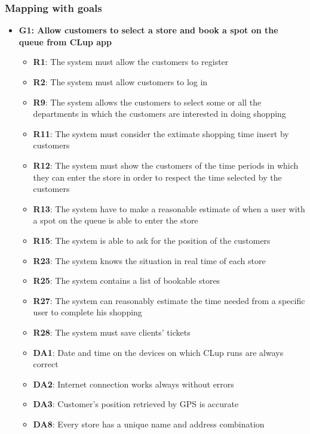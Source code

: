 \documentclass{article}
\begin{document}
		\newpage
		
		\subsubsection{Mapping with goals}
			
			\begin{itemize}			

				\item {\bfseries G1: Allow customers to select a store and book a spot on the queue from CLup app}			

					\begin{itemize}
						
						\item {\bfseries R1}: The system must allow the customers to register
						\item {\bfseries R2}: The system must allow customers to log in
						\item {\bfseries R9}: The system allows the customers to select some or all the departments in which the customers are interested in doing shopping						\item {\bfseries R11}: The system must consider the extimate shopping time insert by customers
						\item {\bfseries R12}: The system must show the customers of the time periods in which they can enter the store in order to respect the time selected by the customers
						\item {\bfseries R13}: The system have to make a reasonable estimate of when a user with a spot on the queue is able to enter the store
						\item {\bfseries R15}: The system is able to ask for the position of the customers
						\item {\bfseries R23}: The system knows the situation in real time of each store \\				\item {\bfseries R25}: The system contains a list of bookable stores
						\item {\bfseries R27}: The system can reasonably estimate the time needed from a specific user to complete his shopping
						\item {\bfseries R28}: The system must save clients’ tickets
						
						
						\item {\bfseries DA1}: Date and time on the devices on which CLup runs are always correct
						\item {\bfseries DA2}: Internet connection works always without errors
						\item {\bfseries DA3}: Customer’s position retrieved by GPS is accurate
						\item {\bfseries DA8}: Every store has a unique name and address combination
					

\end{itemize}
\end{itemize}
\end{document}

